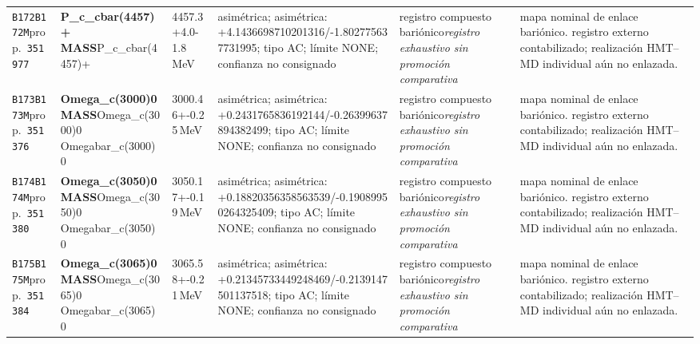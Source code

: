 \begin{landscape}
\begin{longtable}{L{1.85cm}L{4.45cm}L{2.35cm}L{4.05cm}L{3.35cm}L{7.15cm}}
\texttt{B172}\newline \texttt{B172M}\newline prop.\ \texttt{351977} & \textbf{P\_\allowbreak{}c\_\allowbreak{}cbar(4457)+ MASS}\newline P\_\allowbreak{}c\_\allowbreak{}cbar(4457)+ & 4457.3+4.0-1.8\,MeV & asimétrica; asimétrica: +4.1436698710201316/-1.802775637731995; tipo AC; límite NONE; confianza no consignado & registro compuesto bariónico\newline \emph{registro exhaustivo sin promoción comparativa} & mapa nominal de enlace bariónico. registro externo contabilizado; realización HMT--MD individual aún no enlazada. \\
\texttt{B173}\newline \texttt{B173M}\newline prop.\ \texttt{351376} & \textbf{Omega\_\allowbreak{}c(3000)0 MASS}\newline Omega\_\allowbreak{}c(3000)0 \textbar{}\allowbreak{} Omegabar\_\allowbreak{}c(3000)0 & 3000.46+-0.25\,MeV & asimétrica; asimétrica: +0.2431765836192144/-0.26399637894382499; tipo AC; límite NONE; confianza no consignado & registro compuesto bariónico\newline \emph{registro exhaustivo sin promoción comparativa} & mapa nominal de enlace bariónico. registro externo contabilizado; realización HMT--MD individual aún no enlazada. \\
\texttt{B174}\newline \texttt{B174M}\newline prop.\ \texttt{351380} & \textbf{Omega\_\allowbreak{}c(3050)0 MASS}\newline Omega\_\allowbreak{}c(3050)0 \textbar{}\allowbreak{} Omegabar\_\allowbreak{}c(3050)0 & 3050.17+-0.19\,MeV & asimétrica; asimétrica: +0.18820356358563539/-0.19089950264325409; tipo AC; límite NONE; confianza no consignado & registro compuesto bariónico\newline \emph{registro exhaustivo sin promoción comparativa} & mapa nominal de enlace bariónico. registro externo contabilizado; realización HMT--MD individual aún no enlazada. \\
\texttt{B175}\newline \texttt{B175M}\newline prop.\ \texttt{351384} & \textbf{Omega\_\allowbreak{}c(3065)0 MASS}\newline Omega\_\allowbreak{}c(3065)0 \textbar{}\allowbreak{} Omegabar\_\allowbreak{}c(3065)0 & 3065.58+-0.21\,MeV & asimétrica; asimétrica: +0.21345733449248469/-0.2139147501137518; tipo AC; límite NONE; confianza no consignado & registro compuesto bariónico\newline \emph{registro exhaustivo sin promoción comparativa} & mapa nominal de enlace bariónico. registro externo contabilizado; realización HMT--MD individual aún no enlazada. \\

\end{longtable}
\end{landscape}
